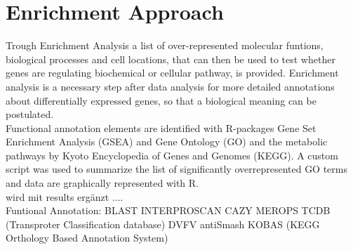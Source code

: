 \documentclass[12pt, a4paper]{report}
\begin{document}
\section{Enrichment Approach}
Trough Enrichment Analysis a list of over-represented molecular funtions, biological processes and cell locations, that can then be used to test whether genes are regulating biochemical or cellular pathway, is provided. Enrichment analysis is a necessary step after data analysis for more detailed annotations about differentially expressed genes, so that a biological meaning can be postulated. \\ 
Functional annotation elements are identified with R-packages Gene Set Enrichment Analysis (GSEA) \cite{Subramanian2005} and Gene Ontology (GO) and the metabolic pathways by Kyoto Encyclopedia of Genes and Genomes (KEGG). 
A custom script was used to summarize the list of significantly overrepresented GO terms and data are graphically represented with R. \\


wird mit results ergänzt
.... \\
Funtional Annotation: 
BLAST
INTERPROSCAN
CAZY
MEROPS
TCDB (Transproter Classification database)
DVFV
antiSmash
KOBAS (KEGG Orthology Based Annotation System)



\vfill
\end{document}
